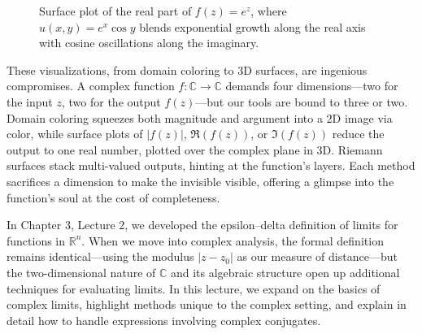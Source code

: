 \begin{figure}[h]
\centering
{}
\caption{Surface plot of the real part of $f(z) = e^z$, where $u(x, y) = e^x \cos y$ blends exponential growth along the real axis with cosine oscillations along the imaginary.}
\label{fig:real-exp}
\end{figure}

\noindent These visualizations, from domain coloring to 3D surfaces, are ingenious compromises. A complex function \( f: \mathbb{C} \to \mathbb{C} \) demands four dimensions—two for the input \( z \), two for the output \( f(z) \)—but our tools are bound to three or two. Domain coloring squeezes both magnitude and argument into a 2D image via color, while surface plots of \( |f(z)| \), \( \Re(f(z)) \), or \( \Im(f(z)) \) reduce the output to one real number, plotted over the complex plane in 3D. Riemann surfaces stack multi-valued outputs, hinting at the function's layers. Each method sacrifices a dimension to make the invisible visible, offering a glimpse into the function's soul at the cost of completeness.

\newpage
{} 

\noindent In Chapter 3, Lecture 2, we developed the epsilon–delta definition of limits for functions in \(\mathbb{R}^n\). When we move into complex analysis, the formal definition remains identical—using the modulus \(|z-z_0|\) as our measure of distance—but the two-dimensional nature of \(\mathbb{C}\) and its algebraic structure open up additional techniques for evaluating limits. In this lecture, we expand on the basics of complex limits, highlight methods unique to the complex setting, and explain in detail how to handle expressions involving complex conjugates.

